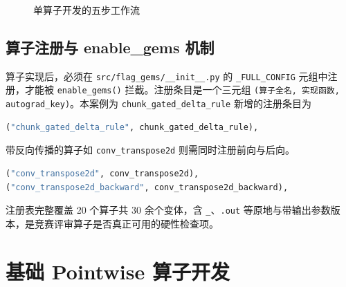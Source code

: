 \begin{figure}[!htbp]
\centering
{}
\caption{单算子开发的五步工作流}
\label{fig:workflow}
\end{figure}

\subsection{算子注册与 enable\_gems 机制}
算子实现后，必须在 \texttt{src/flag\_gems/\_\_init\_\_.py} 的 \texttt{\_FULL\_CONFIG} 元组中注册，才能被 \texttt{enable\_gems()} 拦截。注册条目是一个三元组 \texttt{(算子全名, 实现函数, autograd\_key)}。本案例为 \texttt{chunk\_gated\_delta\_rule} 新增的注册条目为
\begin{lstlisting}[language=Python]
("chunk_gated_delta_rule", chunk_gated_delta_rule),
\end{lstlisting}
带反向传播的算子如 \texttt{conv\_transpose2d} 则需同时注册前向与后向。
\begin{lstlisting}[language=Python]
("conv_transpose2d", conv_transpose2d),
("conv_transpose2d_backward", conv_transpose2d_backward),
\end{lstlisting}
注册表完整覆盖 20 个算子共 30 余个变体，含 \texttt{\_}、\texttt{.out} 等原地与带输出参数版本，是竞赛评审算子是否真正可用的硬性检查项。

\section{基础 Pointwise 算子开发}

